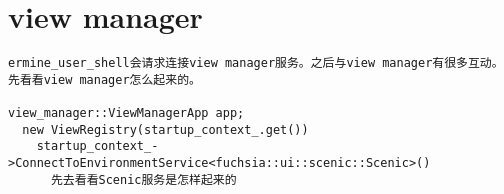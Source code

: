 \section{view manager}

\begin{verbatim}
ermine_user_shell会请求连接view manager服务。之后与view manager有很多互动。
先看看view manager怎么起来的。

view_manager::ViewManagerApp app;
  new ViewRegistry(startup_context_.get())
    startup_context_->ConnectToEnvironmentService<fuchsia::ui::scenic::Scenic>()
      先去看看Scenic服务是怎样起来的






\end{verbatim}